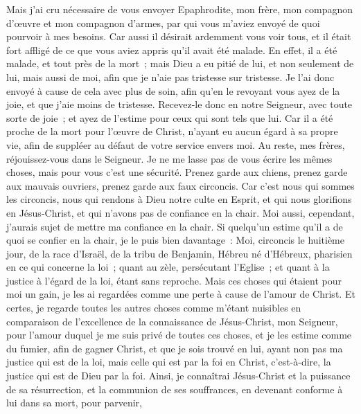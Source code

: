\begin{multicols}{2}
Mais j'ai cru nécessaire de vous envoyer Epaphrodite, mon frère, mon compagnon d'œuvre et mon compagnon d'armes, par qui vous m'aviez envoyé de quoi pourvoir à mes besoins.
Car aussi il désirait ardemment vous voir tous, et il était fort affligé de ce que vous aviez appris qu'il avait été malade.
En effet, il a été malade, et tout près de la mort~; mais Dieu a eu pitié de lui, et non seulement de lui, mais aussi de moi, afin que je n'aie pas tristesse sur tristesse.
Je l'ai donc envoyé à cause de cela avec plus de soin, afin qu'en le revoyant vous ayez de la joie, et que j'aie moins de tristesse.
Recevez-le donc en notre Seigneur, avec toute sorte de joie~; et ayez de l'estime pour ceux qui sont tels que lui. 
Car il a été proche de la mort pour l'œuvre de Christ, n'ayant eu aucun égard à sa propre vie, afin de suppléer au défaut de votre service envers moi.
\VerseOne{}Au reste, mes frères, réjouissez-vous dans le Seigneur. Je ne me lasse pas de vous écrire les mêmes choses, mais pour vous c'est une sécurité.
Prenez garde aux chiens, prenez garde aux mauvais ouvriers, prenez garde aux faux circoncis.
Car c'est nous qui sommes les circoncis, nous qui rendons à Dieu notre culte en Esprit, et qui nous glorifions en Jésus-Christ, et qui n'avons pas de confiance en la chair.
Moi aussi, cependant, j'aurais sujet de mettre ma confiance en la chair. Si quelqu'un estime qu'il a de quoi se confier en la chair, je le puis bien davantage~:
Moi, circoncis le huitième jour, de la race d'Israël, de la tribu de Benjamin, Hébreu né d'Hébreux, pharisien en ce qui concerne la loi~;
quant au zèle, persécutant l'Eglise~; et quant à la justice à l'égard de la loi, étant sans reproche.
Mais ces choses qui étaient pour moi un gain, je les ai regardées comme une perte à cause de l'amour de Christ.
Et certes, je regarde toutes les autres choses comme m'étant nuisibles en comparaison de l'excellence de la connaissance de Jésus-Christ, mon Seigneur, pour l'amour duquel je me suis privé de toutes ces choses, et je les estime comme du fumier, afin de gagner Christ,
et que je sois trouvé en lui, ayant non pas ma justice qui est de la loi, mais celle qui est par la foi en Christ, c'est-à-dire, la justice qui est de Dieu par la foi.
Ainsi, je connaîtrai Jésus-Christ et la puissance de sa résurrection, et la communion de ses souffrances, en devenant conforme à lui dans sa mort, pour parvenir,

\end{multicols}
